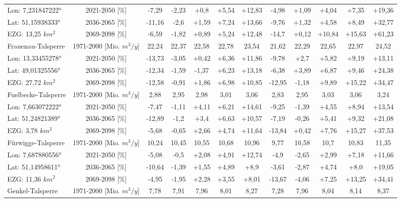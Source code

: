 \begin{longtable}{@{\extracolsep{\fill}}lc|ccccc||ccccc}
\cline{2-12} 
Lon: 7,231847222° & 2021-2050 [\%]  & -7,29 & -2,23 & +0,8 & +5,54 & +12,83 & -4,98 & +1,09 & +4,04 & +7,35 & +19,36\\ 
Lat: 51,15938333° & 2036-2065 [\%]  & -11,16 & -2,6 & +1,59 & +7,24 & +13,66 & -9,76 & +1,32 & +4,58 & +8,49 & +32,77\\ 
EZG: 13,25 $km^2$ & 2069-2098 [\%]  & -6,59 & -1,82 & +0,89 & +5,24 & +12,48 & -14,7 & +0,12 & +10,84 & +15,63 & +61,23\\ 
\hline 
Frauenau-Talsperre & 1971-2000 [Mio. $m^3/y$]  & 22,24 & 22,37 & 22,58 & 22,78 & 23,54 & 21,62 & 22,29 & 22,65 & 22,97 & 24,52\\ 
\cline{2-12} 
Lon: 13,33455278° & 2021-2050 [\%]  & -13,73 & -3,05 & +0,42 & +6,36 & +11,86 & -9,78 & +2,7 & +5,82 & +9,19 & +13,11\\ 
Lat: 49,01325556° & 2036-2065 [\%]  & -12,34 & -1,59 & -1,37 & +6,23 & +13,18 & -6,38 & +3,89 & +6,87 & +9,46 & +24,38\\ 
EZG: 27,72 $km^2$ & 2069-2098 [\%]  & -12,58 & -0,91 & +1,86 & +6,98 & +10,85 & -12,95 & -1,18 & +9,89 & +15,22 & +34,47\\ 
\hline 
Fuelbecke-Talsperre & 1971-2000 [Mio. $m^3/y$]  & 2,88 & 2,95 & 2,98 & 3,01 & 3,06 & 2,83 & 2,95 & 3,03 & 3,06 & 3,24\\ 
\cline{2-12} 
Lon: 7,663072222° & 2021-2050 [\%]  & -7,47 & -1,11 & +4,11 & +6,21 & +14,61 & -9,25 & -1,39 & +4,55 & +8,94 & +13,54\\ 
Lat: 51,24821389° & 2036-2065 [\%]  & -12,89 & -1,2 & +3,4 & +6,63 & +10,57 & -7,19 & -0,26 & +5,41 & +9,32 & +21,08\\ 
EZG: 3,78 $km^2$ & 2069-2098 [\%]  & -5,68 & -0,65 & +2,66 & +4,74 & +11,64 & -13,84 & +0,42 & +7,76 & +15,27 & +37,53\\ 
\hline 
Fürwigge-Talsperre & 1971-2000 [Mio. $m^3/y$]  & 10,24 & 10,45 & 10,55 & 10,68 & 10,96 & 9,77 & 10,58 & 10,7 & 10,83 & 11,35\\ 
\cline{2-12} 
Lon: 7,687880556° & 2021-2050 [\%]  & -5,08 & -0,5 & +2,08 & +4,91 & +12,74 & -4,9 & -2,65 & +2,99 & +7,18 & +11,66\\ 
Lat: 51,14958611° & 2036-2065 [\%]  & -10,64 & -1,39 & +1,55 & +4,89 & +8,9 & -3,61 & -2,87 & +4,74 & +8,0 & +19,05\\ 
EZG: 11,36 $km^2$ & 2069-2098 [\%]  & -4,95 & -1,95 & +2,28 & +3,55 & +8,01 & -13,67 & -4,06 & +7,25 & +13,25 & +34,41\\ 
\hline 
Genkel-Talsperre & 1971-2000 [Mio. $m^3/y$]  & 7,78 & 7,91 & 7,96 & 8,01 & 8,27 & 7,28 & 7,96 & 8,04 & 8,14 & 8,37\\ 

\end{longtable}
